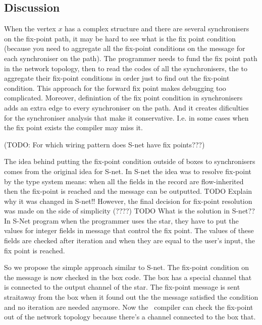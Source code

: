     \subsection{Discussion\label{ffp_discussion}}
When the vertex $x$ has a complex structure and there are several synchronisers on the fix-point path, it may be hard to see what is the fix point condition (because you need to aggregate all the fix-point conditions on the message for each synchroniser on the path). The programmer needs to fund the fix point path in the network topology, then to read the codes of all the synchronisers, the to aggregate their fix-point conditions in order just to find out the fix-point condition. This approach for the forward fix point makes debugging too complicated. Moreover, definintion of the fix point condition in synchronisers adds an extra edge to every synchroniser on the path. And it creates dificulties for the synchroniser analysis that make it conservative. I.e. in some cases when the fix point exists the compiler may miss it.

(TODO: For which wiring pattern does S-net have fix points???)

The idea behind putting the fix-point condition outside of boxes to synchronisers comes from the original idea for S-net. In S-net the idea was to resolve fix-point by the type system means: when all the fields in the record are flow-inherited then the fix-point is reached and the message can be outputted. TODO Explain why it was changed in S-net!! However, the final decision for fix-point resolution was made on the side of simplicity (????) TODO What is the solution in S-net??
In S-Net program when the programmer uses the star, they have to put the values for integer fields in message that control the fix point. The values of these fields are checked after iteration and when they are equal to the user's input, the fix point is reached.

So we propose the simple approach similar to S-net. The fix-point condition on the message is now checked in the box code. The box has a special channel that is connected to the output channel of the star. The fix-point message is sent straitaway from the box when it found out the the message satisfied the condition and no iteration are needed anymore. Now the \ak\ compiler can check the fix-point out of the network topology because there's a channel connected to the box that.


